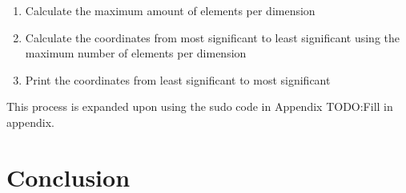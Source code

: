 \documentclass[10pt,twocolumn]{witseiepaper}
\begin{document}
\begin{enumerate}
	\item Calculate the maximum amount of elements per dimension
	\item Calculate the coordinates from most significant to least significant using the maximum number of elements per dimension
	\item Print the coordinates from least significant to most significant
\end{enumerate}

This process is expanded upon using the sudo code in Appendix TODO:Fill in appendix.

\section{Conclusion}




\newpage
\onecolumn
\end{document}
